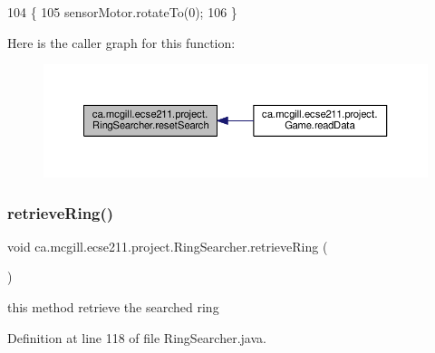 \begin{DoxyCode}
104                             \{
105     sensorMotor.rotateTo(0);
106   \}
\end{DoxyCode}
Here is the caller graph for this function\+:\nopagebreak
\begin{figure}[H]
\begin{center}
\leavevmode
\includegraphics[width=350pt]{classca_1_1mcgill_1_1ecse211_1_1project_1_1_ring_searcher_ad73c50b29163d91292de418101cce21e_icgraph}
\end{center}
\end{figure}
\mbox{\label{classca_1_1mcgill_1_1ecse211_1_1project_1_1_ring_searcher_afca3a0c746b07abb88881d926f4fe71f}} 
\subsubsection{\texorpdfstring{retrieve\+Ring()}{retrieveRing()}}
{\footnotesize\ttfamily void ca.\+mcgill.\+ecse211.\+project.\+Ring\+Searcher.\+retrieve\+Ring (\begin{DoxyParamCaption}{ }\end{DoxyParamCaption})}

this method retrieve the searched ring 

Definition at line 118 of file Ring\+Searcher.\+java.


